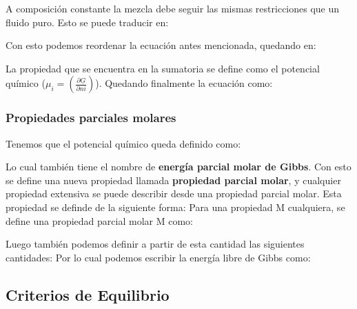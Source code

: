 A composición constante la mezcla debe seguir las mismas restricciones que un fluido puro. Esto se puede traducir en:

Con esto podemos reordenar la ecuación antes mencionada, quedando en:

La propiedad que se encuentra en la sumatoria se define como el potencial químico ($\mu_i=\left( \frac{\partial \underline{G}}{\partial ni} \right)$). Quedando finalmente la ecuación como:


\subsubsection{Propiedades parciales molares}

Tenemos que el potencial químico queda definido como:

Lo cual también tiene el nombre de \textbf{energía parcial molar de Gibbs}. Con esto se define una nueva propiedad llamada \textbf{propiedad parcial molar}, y cualquier propiedad extensiva se puede describir desde una propiedad parcial molar.
Esta propiedad se definde de la siguiente forma: Para una propiedad M cualquiera, se define una propiedad parcial molar M como:


Luego también podemos definir a partir de esta cantidad las siguientes cantidades:
Por lo cual podemos escribir la energía libre de Gibbs como:


\subsection{Criterios de Equilibrio}

